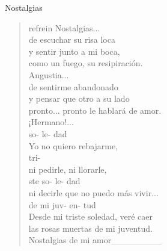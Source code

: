 \begin{song}{Nostalgias}
\begin{verse}{refrein}
	Nostalgias...\\
	de escuchar su risa loca\\
	y sentir junto a mi boca,\\
	como un fuego, su resipiración.\\
	Angustia...\\
	\chord{---}de sentirme abandonado\\
	y pensar que otro a su lado\\
	pronto... pronto le hablará de amor.\\
	¡Hermano!...   \chord{---}\\
	\hspace*{2.8em} so- le- dad\\
	Yo no quiero rebajarme,\\
	\hspace*{5.8em}tri-\\
	 ni pedirle, ni llorarle,\\
	\hspace*{2.2em} ste so- le- dad\\
	ni decirle que no puedo más vivir...\\
	\hspace*{3em} de\hspace{0.5em} mi\hspace{2em} juv- en- tud\\
	Desde mi triste soledad, veré caer\\
	las rosas muertas de mi juventud.\hspace{1em}\hspace{2.9em}\hspace{1.5em}\hspace{1.7em}\\
	\hspace*{13em} Nostalgias   de mi amor\_\_\_\_\_\_\_\_

\end{verse}
\end{song}

